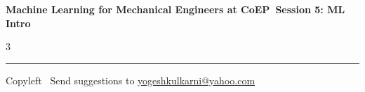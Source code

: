 \documentclass[8pt,landscape]{article}
\begin{document}
\footnotesize

\begin{center}
\Large{\textbf{Machine Learning for Mechanical Engineers at CoEP\ Session 5: ML Intro}}
\end{center}

\begin{multicols}{3}

\end{multicols}

\rule{\linewidth}{0.25pt}
\scriptsize
Copyleft \textcopyleft\  Send suggestions to
\href{http://www.yogeshkulkarni.com}{yogeshkulkarni@yahoo.com}
\end{document}
